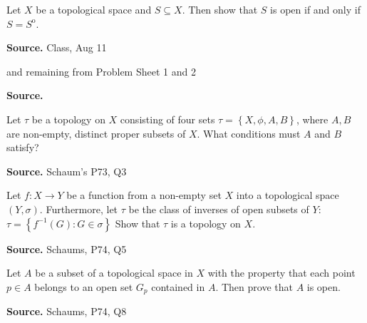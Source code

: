 \documentclass[12pt,twoside]{report}
\newenvironment*{source}{\hfill\scriptsize\textbf{Source.}\space}{\par}
\begin{document}
\begin{samepage}
\begin{ex}
Let $X$ be a topological space and $S \subseteq X$. Then show that $S$ is open if and only if $S = S ^\mathrm{o}$.
\end{ex}
\begin{source}
Class, Aug 11
\end{source}
\end{samepage}

\begin{samepage}
\begin{ex}
 and remaining from Problem Sheet 1 and 2
\end{ex}
\begin{source}
\end{source}
\end{samepage}


\begin{samepage}
\begin{ex}
Let $\tau$ be a topology on $X$ consisting of four sets $ \tau = \left\{ X, \phi, A, B \right\} $, where $A, B$ are non-empty, distinct proper subsets of $X$.
What conditions must $A$ and $B$ satisfy?
\end{ex}
\begin{source}
Schaum's P73, Q3
\end{source}
\end{samepage}

\begin{samepage}
\begin{ex}
Let $f \colon X \to Y$ be a function from a non-empty set $X$ into a topological space $\left (Y, \sigma\right )$.
Furthermore, let $\tau$ be the class of inverses of open subsets of $Y$:
$\tau = \left\{ f^{-1} \left (G\right )  :  G \in \sigma \right\} $
Show that $\tau$ is a topology on $X$.
\end{ex}
\begin{source}
Schaums, P74, Q5
\end{source}
\end{samepage}

\begin{samepage}
\begin{ex}
Let $A$ be a subset of a topological space in $X$ with the property that each point $p \in A$ belongs to an open set $G_p$ contained in $A$. 
Then prove that $A$ is open.
\end{ex}
\begin{source}
Schaums, P74, Q8
\end{source}
\end{samepage}
\end{document}
